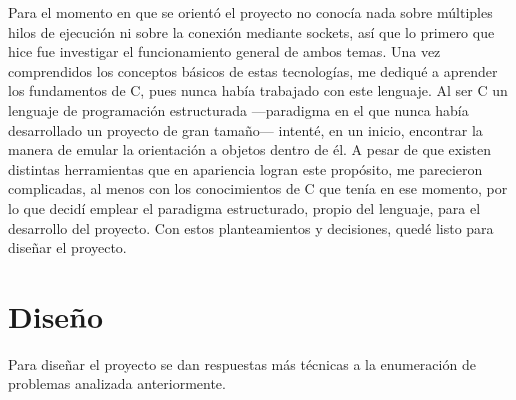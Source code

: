 \documentclass{article}
\begin{document}
    Para el momento en que se orientó el proyecto no conocía nada sobre múltiples hilos de ejecución ni sobre la conexión mediante sockets, así que lo primero que hice fue investigar el funcionamiento general de ambos temas. Una vez comprendidos los conceptos básicos de estas tecnologías, me dediqué a aprender los fundamentos de C, pues nunca había trabajado con este lenguaje. Al ser C un lenguaje de programación estructurada —paradigma en el que nunca había desarrollado un proyecto de gran tamaño— intenté, en un inicio, encontrar la manera de emular la orientación a objetos dentro de él. A pesar de que existen distintas herramientas que en apariencia logran este propósito, me parecieron complicadas, al menos con los conocimientos de C que tenía en ese momento, por lo que decidí emplear el paradigma estructurado, propio del lenguaje, para el desarrollo del proyecto. Con estos planteamientos y decisiones, quedé listo para diseñar el proyecto.

    \section{Diseño}

    Para diseñar el proyecto se dan respuestas más técnicas a la enumeración de problemas analizada anteriormente.
\end{document}
